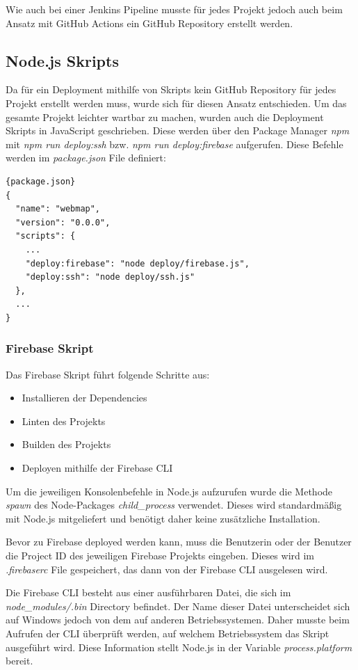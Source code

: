 Wie auch bei einer Jenkins Pipeline musste für jedes Projekt jedoch auch beim
Ansatz mit GitHub Actions ein GitHub Repository erstellt werden.

\subsection{Node.js Skripts}
Da für ein Deployment mithilfe von Skripts kein GitHub Repository für jedes Projekt erstellt werden muss,
wurde sich für diesen Ansatz entschieden.
Um das gesamte Projekt leichter wartbar zu machen, wurden auch die Deployment Skripts in JavaScript geschrieben.
Diese werden über den Package Manager \textit{npm} mit \textit{npm run deploy:ssh} bzw.
\textit{npm run deploy:firebase} aufgerufen.
Diese Befehle werden im \textit{package.json} File definiert:

\begin{lstlisting}[label={lst:package.json}]{package.json}
{
  "name": "webmap",
  "version": "0.0.0",
  "scripts": {
    ...
    "deploy:firebase": "node deploy/firebase.js",
    "deploy:ssh": "node deploy/ssh.js"
  },
  ...
}
\end{lstlisting}

\subsubsection{Firebase Skript}
Das Firebase Skript führt folgende Schritte aus:

\begin{itemize}
    \item Installieren der Dependencies
    \item Linten des Projekts
    \item Builden des Projekts
    \item Deployen mithilfe der Firebase CLI
\end{itemize}

Um die jeweiligen Konsolenbefehle in Node.js aufzurufen wurde die Methode \textit{spawn} des Node-Packages
\textit{child\_process} verwendet.
Dieses wird standardmäßig mit Node.js mitgeliefert und benötigt daher keine zusätzliche Installation.

Bevor zu Firebase deployed werden kann, muss die Benutzerin oder der Benutzer die Project ID des jeweiligen
Firebase Projekts eingeben.
Dieses wird im \textit{.firebaserc} File gespeichert, das dann von der Firebase CLI ausgelesen wird.

Die Firebase CLI besteht aus einer ausführbaren Datei, die sich im \textit{node\_modules/.bin} Directory befindet.
Der Name dieser Datei unterscheidet sich auf Windows jedoch von dem auf anderen Betriebssystemen.
Daher musste beim Aufrufen der CLI überprüft werden, auf welchem Betriebssystem das Skript ausgeführt wird.
Diese Information stellt Node.js in der Variable \textit{process.platform} bereit.

